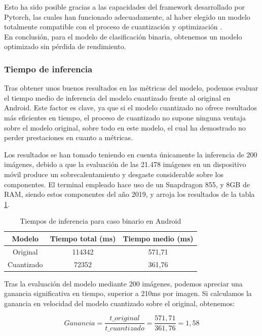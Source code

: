 Esto ha sido posible gracias a las capacidades del framework desarrollado por Pytorch, las cuales han funcionado adecuadamente, al haber elegido un modelo totalmente compatible con el proceso de cuantización y optimización \cite{comptquant}.\\

En conclusión, para el modelo de clasificación binaria, obtenemos un modelo optimizado sin pérdida de rendimiento.

\subsubsection{Tiempo de inferencia}

Tras obtener unos buenos resultados en las métricas del modelo, podemos evaluar el tiempo medio de inferencia del modelo cuantizado frente al original en Android. Este factor es clave, ya que si el modelo cuantizado no ofrece resultados más eficientes en tiempo, el proceso de cuantizado no supone ninguna ventaja sobre el modelo original, sobre todo en este modelo, el cual ha demostrado no perder prestaciones en cuanto a métricas.

Los resultados se han tomado teniendo en cuenta únicamente la inferencia de 200 imágenes, debido a que la evaluación de las 21.478 imágenes en un dispositivo móvil produce un sobrecalentamiento y desgaste considerable sobre los componentes. El terminal empleado hace uso de un Snapdragon 855, y 8GB de RAM, siendo estos componentes del año 2019, y arroja los resultados de la tabla \ref{infbintmp}.

\begin{table}[H]
	\centering
	\begin{tabular}{|c|c|c|}
		\hline
		Modelo & Tiempo total (ms) & Tiempo medio (ms) \\ \hline
		Original & 114342 & 571,71 \\ \hline
		Cuantizado & 72352 & 361,76 \\ \hline
	\end{tabular}
	\caption{Tiempos de inferencia para caso binario en Android}
	\label{infbintmp}
\end{table}

Tras la evaluación del modelo mediante 200 imágenes, podemos apreciar una ganancia significativa en tiempo, superior a 210ms por imagen. Si calculamos la ganancia en velocidad del modelo cuantizado sobre el original, obtenemos:

$$Ganancia = \frac{t\_original}{t\_cuantizado} = \frac{571,71}{361,76} = 1,58$$

